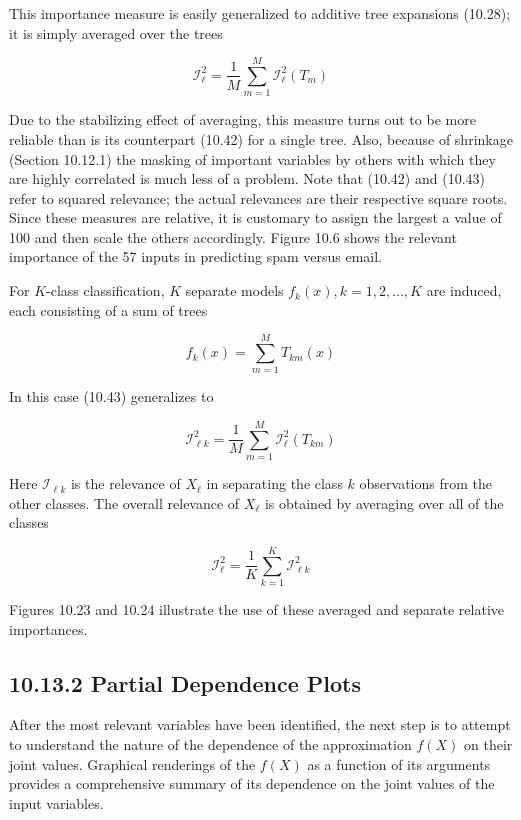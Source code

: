 \documentclass[10pt]{article}
\begin{document}
This importance measure is easily generalized to additive tree expansions (10.28); it is simply averaged over the trees


\begin{equation*}
\mathcal{I}_{\ell}^{2}=\frac{1}{M} \sum_{m=1}^{M} \mathcal{I}_{\ell}^{2}\left(T_{m}\right) \tag{10.43}
\end{equation*}


Due to the stabilizing effect of averaging, this measure turns out to be more reliable than is its counterpart (10.42) for a single tree. Also, because of shrinkage (Section 10.12.1) the masking of important variables by others with which they are highly correlated is much less of a problem. Note that (10.42) and (10.43) refer to squared relevance; the actual relevances are their respective square roots. Since these measures are relative, it is customary to assign the largest a value of 100 and then scale the others accordingly. Figure 10.6 shows the relevant importance of the 57 inputs in predicting spam versus email.

For $K$-class classification, $K$ separate models $f_{k}(x), k=1,2, \ldots, K$ are induced, each consisting of a sum of trees


\begin{equation*}
f_{k}(x)=\sum_{m=1}^{M} T_{k m}(x) \tag{10.44}
\end{equation*}


In this case (10.43) generalizes to


\begin{equation*}
\mathcal{I}_{\ell k}^{2}=\frac{1}{M} \sum_{m=1}^{M} \mathcal{I}_{\ell}^{2}\left(T_{k m}\right) \tag{10.45}
\end{equation*}


Here $\mathcal{I}_{\ell k}$ is the relevance of $X_{\ell}$ in separating the class $k$ observations from the other classes. The overall relevance of $X_{\ell}$ is obtained by averaging over all of the classes


\begin{equation*}
\mathcal{I}_{\ell}^{2}=\frac{1}{K} \sum_{k=1}^{K} \mathcal{I}_{\ell k}^{2} \tag{10.46}
\end{equation*}


Figures 10.23 and 10.24 illustrate the use of these averaged and separate relative importances.

\subsection*{10.13.2 Partial Dependence Plots}
After the most relevant variables have been identified, the next step is to attempt to understand the nature of the dependence of the approximation $f(X)$ on their joint values. Graphical renderings of the $f(X)$ as a function of its arguments provides a comprehensive summary of its dependence on the joint values of the input variables.
\end{document}
